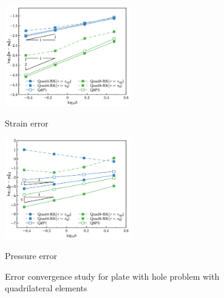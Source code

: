 \begin{figure}[!htp]
\centering
\begin{subcaptiongroup}
\centering
\parbox[b]{0.49\textwidth}{
    \includegraphics[width=0.49\textwidth]{png/plate_with_hole_quad_Hdev.png}
    \caption{Strain error}\label{fg:plate_with_hole_convergence_strain_quad}
}
\parbox[b]{0.49\textwidth}{
    \includegraphics[width=0.49\textwidth]{png/plate_with_hole_quad_L2_p.png}
    \caption{Pressure error}\label{fg:plate_with_hole_convergence_pressure_quad}
}
\end{subcaptiongroup}
\caption{Error convergence study for plate with hole problem with quadrilateral elements}\label{fg:plate_with_hole_convergence_quad}
\end{figure}

